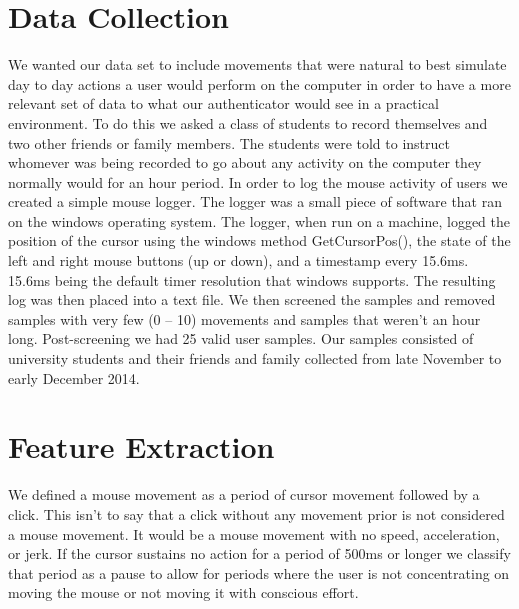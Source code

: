 \documentclass[conference]{IEEEtran}
\begin{document}
\section{Data Collection}
We wanted our data set to include movements that were natural to best simulate day to day actions a user would perform on the computer in order to have a more relevant set of data to what our authenticator would see in a practical environment. To do this we asked a class of students to record themselves and two other friends or family members. The students were told to instruct whomever was being recorded to go about any activity on the computer they normally would for an hour period.  
	In order to log the mouse activity of users we created a simple mouse logger.  The logger was a small piece of software that ran on the windows operating system. The logger, when run on a machine, logged the position of the cursor using the windows method GetCursorPos(), the state of the left and right mouse buttons (up or down), and a timestamp every 15.6ms. 15.6ms being the default timer resolution that windows supports. The resulting log was then placed into a text file. 
We then screened the samples and removed samples with very few (0 – 10) movements and samples that weren't an hour long. Post-screening we had 25 valid user samples.  Our samples consisted of university students and their friends and family collected from late November to early December 2014.


\bgroup
\def\arraystretch{1.5}
\egroup
{}


\section{Feature Extraction}
	We defined a mouse movement as a period of cursor movement followed by a click. This isn't to say that a click without any movement prior is not considered a mouse movement. It would be a mouse movement with no speed, acceleration, or jerk. If the cursor sustains no action for a period of 500ms or longer we classify that period as a pause to allow for periods where the user is not concentrating on moving the mouse or not moving it with conscious effort.
\end{document}
